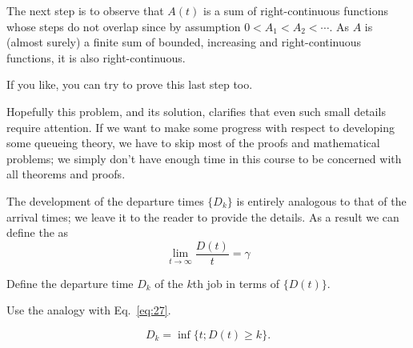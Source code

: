 \begin{exercise}
\begin{solution}
    The next step is to observe that $A(t)$ is a sum of
    right-continuous functions whose steps do not overlap since by
    assumption $0<A_1 < A_2 < \cdots$. As $A$ is (almost surely)
    a finite sum of bounded, increasing and right-continuous functions,
    it is also right-continuous.

    If you like, you can try to prove this last step too. 

  Hopefully this problem, and its solution, clarifies that even such
  small details require attention. If we want to make some progress
  with respect to developing some queueing theory, we have to skip
  most of the proofs and mathematical problems; we simply don't have
  enough time in this course  to be concerned with all theorems
  and proofs.

 \end{solution}
\end{exercise}

The development of the departure times $\{D_k\}$ is entirely analogous
to that of the arrival times; we leave it to the reader to provide the
details. As a result we can define the  as
\begin{equation}\label{eq:28}
  \lim_{t\to\infty} \frac{D(t)}t = \gamma
\end{equation}


\begin{exercise}
  Define the departure time $D_{k}$ of the $k$th job in terms of
  $\{D(t)\}$. 
  \begin{hint}
Use the analogy with Eq.~\eqref{eq:27}.
  \end{hint}
\begin{solution}
  \begin{equation*}
 D_{k} = \inf\{t; D(t) \geq k\}.
  \end{equation*}
\end{solution}
\end{exercise}

